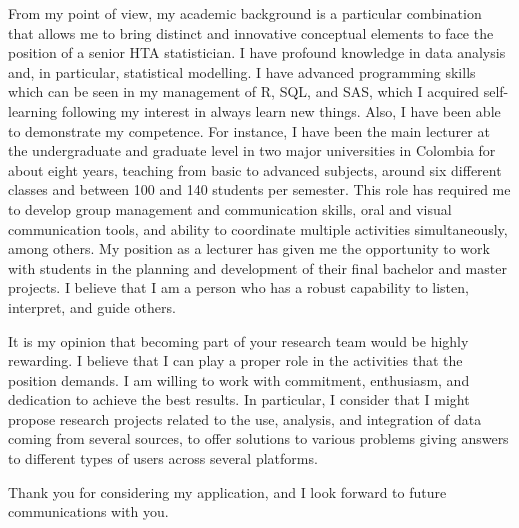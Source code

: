 \documentclass[11pt, a4paper]{awesome-cv}
\begin{document}
\begin{cvletter}
From my point of view, my academic background is a particular combination that allows me to bring distinct and innovative conceptual elements to face the position of a senior HTA statistician. I have profound knowledge in data analysis and, in particular, statistical modelling. I have advanced programming skills which can be seen in my management of R, SQL, and SAS, which I acquired self-learning following my interest in always learn new things. Also, I have been able to demonstrate my competence. For instance, I have been the main lecturer at the undergraduate and graduate level in two major universities in Colombia for about eight years, teaching from basic to advanced subjects, around six different classes and between 100 and 140 students per semester. This role has required me to develop group management and communication skills, oral and visual communication tools, and ability to coordinate multiple activities simultaneously, among others. My position as a lecturer has given me the opportunity to work with students in the planning and development of their final bachelor and master projects. I believe that I am a person who has a robust capability to listen, interpret, and guide others. \par
It is my opinion that becoming part of your research team would be highly rewarding. I believe that I can play a proper role in the activities that the position demands. I am willing to work with commitment, enthusiasm, and dedication to achieve the best results. In particular, I consider that I might propose research projects related to the use, analysis, and integration of data coming from several sources, to offer solutions to various problems giving answers to different types of users across several platforms.\par\bigskip

Thank you for considering my application, and I look forward to future communications with you.
\end{cvletter}


\makeletterclosing
\end{document}
